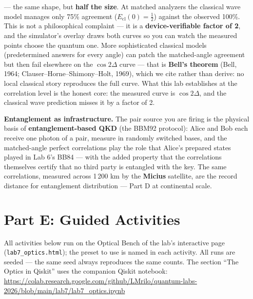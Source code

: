 \documentclass[a4paper,11pt]{article}
\begin{document}
--- the same shape, but \textbf{half the size}. At matched analyzers the classical
wave model manages only 75\% agreement ($E_{\text{cl}}(0) = \tfrac12$) against the
observed 100\%. This is not a philosophical complaint --- it is a
\textbf{device-verifiable factor of 2}, and the simulator's overlay draws both
curves so you can watch the measured points choose the quantum one. More
sophisticated classical models (predetermined answers for every angle) can patch the
matched-angle agreement but then fail elsewhere on the $\cos 2\Delta$ curve --- that
is \textbf{Bell's theorem} (Bell, 1964; Clauser--Horne--Shimony--Holt, 1969), which
we cite rather than derive: no local classical story reproduces the full curve. What
this lab establishes at the correlation level is the honest core: the measured curve
is $\cos 2\Delta$, and the classical wave prediction misses it by a factor of 2.

\begin{industrybox}
\textbf{Entanglement as infrastructure.} The pair source you are firing is the
physical basis of \textbf{entanglement-based QKD} (the BBM92 protocol): Alice and
Bob each receive one photon of a pair, measure in randomly switched bases, and the
matched-angle perfect correlations play the role that Alice's prepared states played
in Lab 6's BB84 --- with the added property that the correlations themselves certify
that no third party is entangled with the key. The same correlations, measured
across 1\,200 km by the \textbf{Micius} satellite, are the record distance for
entanglement distribution --- Part D at continental scale.
\end{industrybox}

\newpage

\section{Part E: Guided Activities}

\begin{simulatorbox}
All activities below run on the Optical Bench of the lab's interactive page
(\texttt{lab7\_optics.html}); the preset to use is named in each activity. All runs
are seeded --- the same seed always reproduces the same counts. The section
``The Optics in Qiskit'' uses the companion Qiskit notebook:\\[4pt]
\url{https://colab.research.google.com/github/LMrilo/quantum-labs-2026/blob/main/lab7/lab7_optics.ipynb}
\end{simulatorbox}
\end{document}
